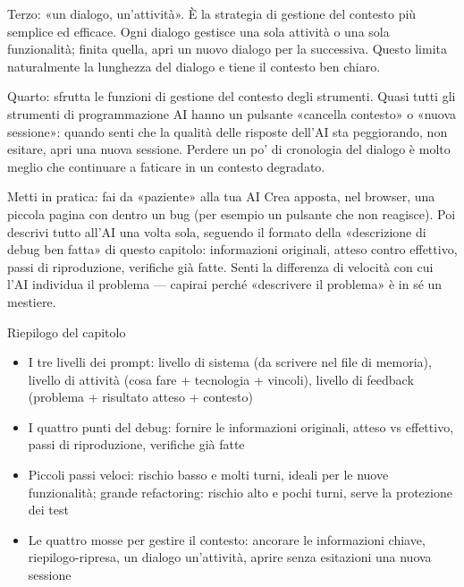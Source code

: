 Terzo: «un dialogo, un'attività». È la strategia di gestione del contesto più semplice ed efficace. Ogni dialogo gestisce una sola attività o una sola funzionalità; finita quella, apri un nuovo dialogo per la successiva. Questo limita naturalmente la lunghezza del dialogo e tiene il contesto ben chiaro.

Quarto: sfrutta le funzioni di gestione del contesto degli strumenti. Quasi tutti gli strumenti di programmazione AI hanno un pulsante «cancella contesto» o «nuova sessione»: quando senti che la qualità delle risposte dell'AI sta peggiorando, non esitare, apri una nuova sessione. Perdere un po' di cronologia del dialogo è molto meglio che continuare a faticare in un contesto degradato.

\begin{tcbpractice}{Metti in pratica: fai da «paziente» alla tua AI}
Crea apposta, nel browser, una piccola pagina con dentro un bug (per esempio un pulsante che non reagisce). Poi descrivi tutto all'AI una volta sola, seguendo il formato della «descrizione di debug ben fatta» di questo capitolo: informazioni originali, atteso contro effettivo, passi di riproduzione, verifiche già fatte. Senti la differenza di velocità con cui l'AI individua il problema — capirai perché «descrivere il problema» è in sé un mestiere.

\end{tcbpractice}

\begin{tcbsummary}{Riepilogo del capitolo}
\begin{itemize}
  \item I tre livelli dei prompt: livello di sistema (da scrivere nel file di memoria), livello di attività (cosa fare + tecnologia + vincoli), livello di feedback (problema + risultato atteso + contesto)
  \item I quattro punti del debug: fornire le informazioni originali, atteso vs effettivo, passi di riproduzione, verifiche già fatte
  \item Piccoli passi veloci: rischio basso e molti turni, ideali per le nuove funzionalità; grande refactoring: rischio alto e pochi turni, serve la protezione dei test
  \item Le quattro mosse per gestire il contesto: ancorare le informazioni chiave, riepilogo-ripresa, un dialogo un'attività, aprire senza esitazioni una nuova sessione
\end{itemize}

\end{tcbsummary}
